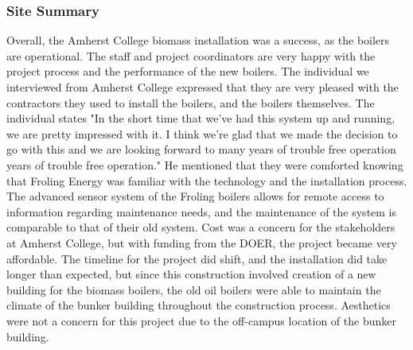 \subsubsection{Site Summary}
\par Overall, the Amherst College biomass installation was a success, as the boilers are operational. The staff and project coordinators are very happy with the project process and the performance of the new boilers. The individual we interviewed from Amherst College expressed that they are very pleased with the contractors they used to install the boilers, and the boilers themselves. The individual states "In the short time that we've had this system up and running, we are pretty impressed with it. I think we're glad that we made the decision to go with this and we are looking forward to many years of trouble free operation years of trouble free operation." He mentioned that they were comforted knowing that Froling Energy was familiar with the technology and the installation process. The advanced sensor system of the Froling boilers allows for remote access to information regarding maintenance needs, and the maintenance of the system is comparable to that of their old system. Cost was a concern for the stakeholders at Amherst College, but with funding from the DOER, the project became very affordable. The timeline for the project did shift, and the installation did take longer than expected, but since this construction involved creation of a new building for the biomass boilers, the old oil boilers were able to maintain the climate of the bunker building throughout the construction process. Aesthetics were not a concern for this project due to the off-campus location of the bunker building.

